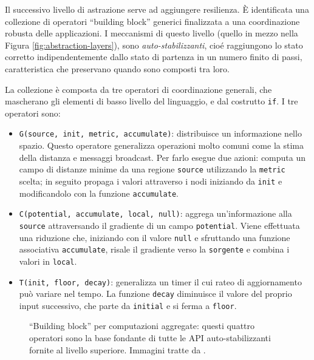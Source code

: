 Il successivo livello di astrazione serve ad aggiungere resilienza. È
identificata una collezione di operatori ``building block'' generici finalizzata
a una coordinazione robusta delle applicazioni. I meccanismi di questo livello
(quello in mezzo nella Figura \ref{fig:abstraction-layers}), sono
\textit{auto-stabilizzanti}, cioé raggiungono lo stato corretto
indipendentemente dallo stato di partenza in un numero finito di passi,
caratteristica che preservano quando sono composti tra loro\cite{7056345}.

La collezione è composta da tre operatori di coordinazione generali, che
mascherano gli elementi di basso livello del linguaggio, e dal costrutto
\texttt{if}. I tre operatori sono:
\begin{itemize}
\item \texttt{G(source, init, metric, accumulate)}: distribuisce un
  informazione nello spazio. Questo operatore generalizza operazioni molto
  comuni come la stima della distanza e messaggi broadcast. Per farlo esegue due
  azioni: computa un campo di distanze minime da una regione \texttt{source}
  utilizzando la \texttt{metric} scelta; in seguito propaga i valori attraverso
  i nodi iniziando da \texttt{init} e modificandolo con la funzione
  \texttt{accumulate}.
\item \texttt{C(potential, accumulate, local, null)}: aggrega un'informazione
  alla \texttt{source} attraversando il gradiente di un campo
  \texttt{potential}. Viene effettuata una riduzione che, iniziando con il
  valore \texttt{null} e sfruttando una funzione associativa
  \texttt{accumulate}, risale il gradiente verso la \texttt{sorgente} e combina
  i valori in \texttt{local}.
\item \texttt{T(init, floor, decay)}: generalizza un timer il cui rateo di
  aggiornamento può variare nel tempo. La funzione \texttt{decay} diminuisce il
  valore del proprio input successivo, che parte da \texttt{initial} e si ferma
  a \texttt{floor}.
\end{itemize}
\begin{figure}
  \centering
  \hfill
  \hfill
  \caption{``Building block'' per computazioni aggregate: questi quattro
    operatori sono la base fondante di tutte le API auto-stabilizzanti fornite
    al livello superiore. Immagini tratte da \cite{Protelis}.}
\end{figure}



